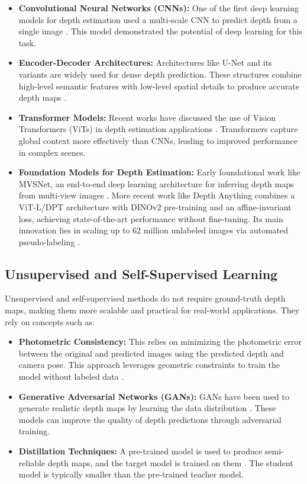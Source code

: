 \begin{itemize}
    \item \textbf{Convolutional Neural Networks (CNNs):} One of the first deep learning models for depth estimation used a multi-scale CNN to predict depth from a single image \cite{eigen2014depth}. This model demonstrated the potential of deep learning for this task.
    \item \textbf{Encoder-Decoder Architectures:} Architectures like U-Net and its variants are widely used for dense depth prediction. These structures combine high-level semantic features with low-level spatial details to produce accurate depth maps \cite{ronneberger2015u}.
    \item \textbf{Transformer Models:} Recent works have discussed the use of Vision Transformers (ViTs) in depth estimation applications \cite{ranftl2021vision}. Transformers capture global context more effectively than CNNs, leading to improved performance in complex scenes.
    \item \textbf{Foundation Models for Depth Estimation:} Early foundational work like MVSNet, an end-to-end deep learning architecture for inferring depth maps from multi-view images \cite{yao2018mvsnet}. More recent work like Depth Anything combines a ViT-L/DPT architecture with DINOv2 pre-training and an affine-invariant loss, achieving state-of-the-art performance without fine-tuning. Its main innovation lies in scaling up to 62 million unlabeled images via automated pseudo-labeling \cite{yang2024depth}.
\end{itemize}

\subsection{Unsupervised and Self-Supervised Learning}
\label{subsec:unsupervised}

Unsupervised and self-supervised methods do not require ground-truth depth maps, making them more scalable and practical for real-world applications. They rely on concepts such as:

\begin{itemize}
    \item \textbf{Photometric Consistency:} This relies on minimizing the photometric error between the original and predicted images using the predicted depth and camera pose. This approach leverages geometric constraints to train the model without labeled data \cite{godard2017unsupervised}.
    \item \textbf{Generative Adversarial Networks (GANs):} GANs have been used to generate realistic depth maps by learning the data distribution \cite{xu2022unsupervised}. These models can improve the quality of depth predictions through adversarial training.
    \item \textbf{Distillation Techniques:} A pre-trained model is used to produce semi-reliable depth maps, and the target model is trained on them \cite{he2025distill}. The student model is typically smaller than the pre-trained teacher model.
\end{itemize}

